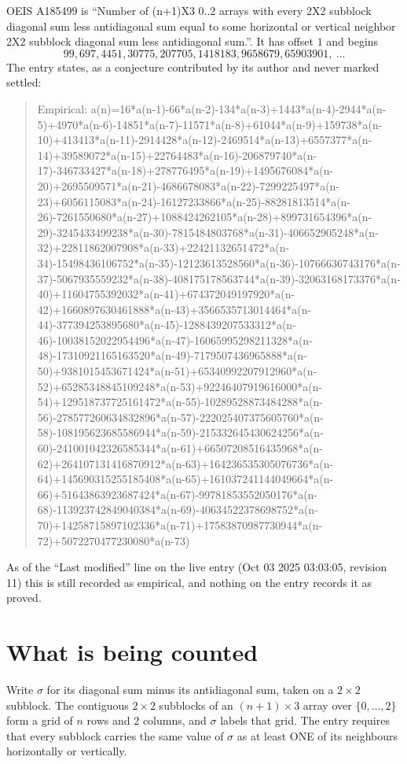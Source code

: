 \documentclass[11pt,a4paper]{article}
\theoremstyle{plain}
\theoremstyle{definition}
\begin{document}
OEIS A185499 is ``Number of (n+1)X3 0..2 arrays with every 2X2 subblock diagonal sum less antidiagonal sum equal to some horizontal or vertical neighbor 2X2 subblock diagonal sum less antidiagonal sum.''. It has offset $1$ and begins
\[
99, 697, 4451, 30775, 207705, 1418183, 9658679, 65903901,\ \dots
\]
The entry states, as a conjecture contributed by its author and never marked settled:
\begin{quote}
Empirical: a(n)=16*a(n-1)-66*a(n-2)-134*a(n-3)+1443*a(n-4)-2944*a(n-5)+4970*a(n-6)-14851*a(n-7)-11571*a(n-8)+61044*a(n-9)+159738*a(n-10)+413413*a(n-11)-2914428*a(n-12)-2469514*a(n-13)+6557377*a(n-14)+39589072*a(n-15)+22764483*a(n-16)-206879740*a(n-17)-346733427*a(n-18)+278776495*a(n-19)+1495676084*a(n-20)+2695509571*a(n-21)-4686678083*a(n-22)-7299225497*a(n-23)+6056115083*a(n-24)-16127233866*a(n-25)-88281813514*a(n-26)-7261550680*a(n-27)+1088424262105*a(n-28)+899731654396*a(n-29)-3245433499238*a(n-30)-7815484803768*a(n-31)-406652905248*a(n-32)+22811862007908*a(n-33)+22421132651472*a(n-34)-15498436106752*a(n-35)-12123613528560*a(n-36)-10766636743176*a(n-37)-5067935559232*a(n-38)-408175178563744*a(n-39)-32063168173376*a(n-40)+11604755392032*a(n-41)+674372049197920*a(n-42)+1660897630461888*a(n-43)+3566535713014464*a(n-44)-377394253895680*a(n-45)-1288439207533312*a(n-46)-10038152022954496*a(n-47)-16065995298211328*a(n-48)-17310921165163520*a(n-49)-7179507436965888*a(n-50)+9381015453671424*a(n-51)+65340992207912960*a(n-52)+65285348845109248*a(n-53)+92246407919616000*a(n-54)+129518737725161472*a(n-55)-10289528873484288*a(n-56)-278577260634832896*a(n-57)-222025407375605760*a(n-58)-108195623685586944*a(n-59)-215332645430624256*a(n-60)-241001042326585344*a(n-61)+66507208516435968*a(n-62)+264107131416870912*a(n-63)+164236535305076736*a(n-64)+145690315255185408*a(n-65)+161037241144049664*a(n-66)+51643863923687424*a(n-67)-99781853552050176*a(n-68)-113923742849040384*a(n-69)-40634522378698752*a(n-70)+14258715897102336*a(n-71)+17583870987730944*a(n-72)+5072270477230080*a(n-73)
\end{quote}
As of the ``Last modified'' line on the live entry (Oct 03 2025 03:03:05, revision 11) this is still
recorded as empirical, and nothing on the entry records it as proved.

\section{What is being counted}

Write $\sigma$ for its diagonal sum minus its antidiagonal sum, taken on a $2\times2$ subblock. The contiguous $2\times2$
subblocks of an $(n+1)\times3$ array over $\{0,\dots,2\}$ form a grid of $n$ rows
and $2$ columns, and $\sigma$ labels that grid. The entry
requires that every subblock carries the same value of $\sigma$ as at least ONE of its neighbours horizontally or vertically.
\end{document}

